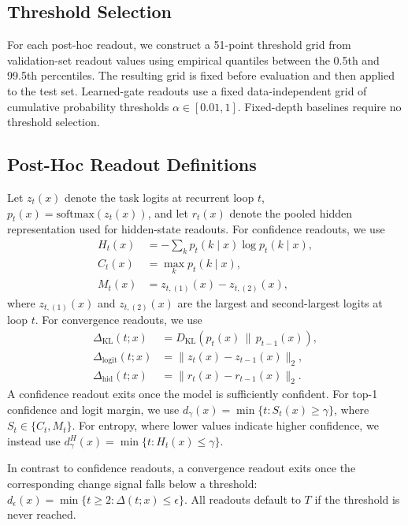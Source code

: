 \documentclass[10pt]{article} %
\begin{document}
\subsection{Threshold Selection}
For each post-hoc readout, we construct a 51-point threshold grid from validation-set readout values using empirical quantiles between the 0.5th and 99.5th percentiles. The resulting grid is fixed before evaluation and then applied to the test set. Learned-gate readouts use a fixed data-independent grid of cumulative probability thresholds $\alpha\in[0.01,1]$. Fixed-depth baselines require no threshold selection.

\subsection{Post-Hoc Readout Definitions}
\label{app:readout_definitions}

Let \(z_t(x)\) denote the task logits at recurrent loop \(t\),
\(p_t(x)=\mathrm{softmax}(z_t(x))\), and let \(r_t(x)\) denote the pooled hidden
representation used for hidden-state readouts. For confidence readouts, we use
\[
\begin{aligned}
H_t(x) &= -\sum_k p_t(k\mid x)\log p_t(k\mid x),\\
C_t(x) &= \max_k p_t(k\mid x),\\
M_t(x) &= z_{t,(1)}(x)-z_{t,(2)}(x),
\end{aligned}
\]
where \(z_{t,(1)}(x)\) and \(z_{t,(2)}(x)\) are the largest and second-largest
logits at loop \(t\). For convergence readouts, we use
\[
\begin{aligned}
\Delta_{\mathrm{KL}}(t;x)
&=D_{\mathrm{KL}}\!\left(p_t(x)\,\|\,p_{t-1}(x)\right),\\
\Delta_{\mathrm{logit}}(t;x)
&=\|z_t(x)-z_{t-1}(x)\|_2,\\
\Delta_{\mathrm{hid}}(t;x)
&=\|r_t(x)-r_{t-1}(x)\|_2.
\end{aligned}
\]
A confidence readout exits once the model is sufficiently confident. For top-1
confidence and logit margin, we use
\(d_\gamma(x)=\min\{t:S_t(x)\ge\gamma\}\), where
\(S_t\in\{C_t,M_t\}\). For entropy, where lower values indicate higher
confidence, we instead use
\(d_\gamma^{H}(x)=\min\{t:H_t(x)\le\gamma\}\).

In contrast to confidence readouts, a convergence readout exits once the corresponding change signal falls below a
threshold: \(d_\epsilon(x)=\min\{t\ge 2:\Delta(t;x)\le\epsilon\}\). All readouts
default to \(T\) if the threshold is never reached.
\end{document}
